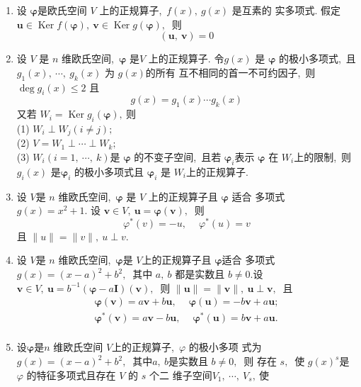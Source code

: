 \begin{enumerate}
		\item 设 $\boldsymbol{\varphi}   $是欧氏空间 $ V $ 上的正规算子,\  $ f(x),\  g(x) $ 是互素的 实多项式. 假定$  \boldsymbol{u} \in \operatorname{Ker} f(\boldsymbol{\varphi}),\  \boldsymbol{v} \in \operatorname{Ker} g(\boldsymbol{\varphi}) ,\ $ 则
		$$(\boldsymbol{u},\  \boldsymbol{v})=0$$
		\item 设  $V $ 是  $n $ 维欧氏空间,\   $\boldsymbol{\varphi}  $ 是$  V $ 上的正规算子. 令$ g(x)$  是  $\boldsymbol{\varphi} $ 的极小多项式,\  且 $ g_{1}(x),\  \cdots,\  g_{k}(x) $ 为  $g(x)  $的所有 互不相同的首一不可约因子,\  则 $ \operatorname{deg} g_{i}(x) \leqslant 2$  且
		$$g(x)=g_{1}(x) \cdots g_{k}(x)$$
		又若 $ W_{i}=\operatorname{Ker} g_{i}(\boldsymbol{\varphi}) ,\  $则\\
		(1) $ W_{i} \perp W_{j}(i \neq j) ;$\\
		(2)  $V=W_{1} \perp \cdots \perp W_{k} ;$\\
		(3) $ W_{i}(i=1,\  \cdots,\  k)  $是  $\boldsymbol{\varphi}  $ 的不变子空间,\  且若  $\boldsymbol{\varphi} _{i}  $表示 $\boldsymbol{\varphi}  $ 在 $ W_{i}  $上的限制,\  则  $g_{i}(x) $ 是$  \boldsymbol{\varphi}_{i}$  的极小多项式且 $ \boldsymbol{\varphi}_{i} $ 是  $W_{i}  $上的正规算子.
		\item 设  $V  $是 $ n$  维欧氏空间,\  $ \boldsymbol{\varphi} $  是 $ V $ 上的正规算子且  $\boldsymbol{\varphi} $ 适合 多项式  $g(x)=x^{2}+1 .$ 设 $ \boldsymbol{v} \in V,\  \boldsymbol{u}=\boldsymbol{\varphi}(\boldsymbol{v}) ,\ $ 则
		$$\varphi^{*}(v)=-u,\  \quad \varphi^{*}(u)=v$$
		且 $ \|u\|=\|v\|,\  u \perp v .$
		\item 设 $ V  $是  $n $ 维欧氏空间,\ $ \boldsymbol{\varphi}  $是 $ V  $上的正规算子且  $\boldsymbol{\varphi} $适合 多项式$  g(x)=(x-a)^{2}+b^{2} ,\ $ 其中  $a,\  b $ 都是实数且 $ b \neq 0 . $设  $\boldsymbol{v} \in V,\  \boldsymbol{u}=b^{-1}(\boldsymbol{\varphi}-a \boldsymbol{I})(\boldsymbol{v}) ,\ $ 则  $\|\boldsymbol{u}\|=\|\boldsymbol{v}\|,\  \boldsymbol{u} \perp \boldsymbol{v} ,\ $ 且
		$$\begin{array}{l}
			\boldsymbol{\varphi}(\boldsymbol{v})=a \boldsymbol{v}+b \boldsymbol{u},\  \quad \boldsymbol{\varphi}(\boldsymbol{u})=-b \boldsymbol{v}+a \boldsymbol{u} ; \\
			\boldsymbol{\varphi} ^{*}(\boldsymbol{v})=a \boldsymbol{v}-b \boldsymbol{u},\  \quad \boldsymbol{\varphi}^{*}(\boldsymbol{u})=b \boldsymbol{v}+a \boldsymbol{u} . \\
		\end{array}$$
		\item 设$ \boldsymbol{\varphi} $是$  n$  维欧氏空间 $ V  $上的正规算子,\ $  \varphi$  的极小多项 式为 $ g(x)=(x-a)^{2}+b^{2} ,\ $ 其中$  a,\  b  $是实数且 $ b \neq 0 ,\ $ 则 存在  $s ,\ $ 使 $ g(x)^{s}  $是 $ \varphi $ 的特征多项式且存在 $ V$  的 $ s $ 个二 维子空间$  V_{1},\  \cdots,\  V_{s} ,\  $使

\end{enumerate}
